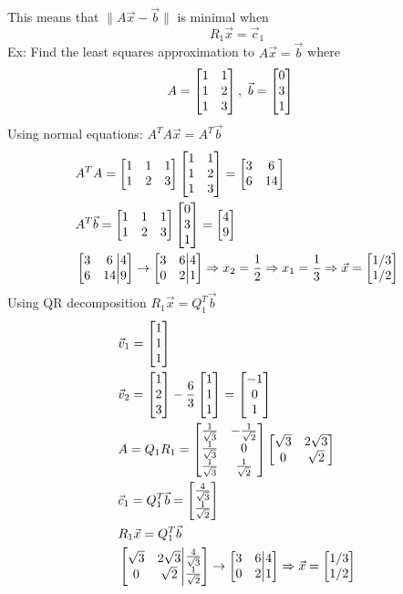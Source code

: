 \documentclass[11pt, fleqn]{article}
\begin{document}
This means that $\|A\vec{x}-\vec{b}\|$ is minimal when
$$R_1\vec{x}=\vec{c}_1$$
Ex: Find the least squares approximation to $A\vec{x}=\vec{b}$ where
\begin{align*}
    &A=\matrixx{1 & 1\\ 1 & 2\\ 1 & 3},\ \vec{b}=\matrixx{0\\3\\1}
\end{align*}
Using normal equations: $A^TA\vec{x}=A^T\vec{b}$
\begin{align*}
    &A^TA=\matrixx{1 & 1 & 1\\ 1 & 2 & 3}\matrixx{1 & 1\\ 1 & 2 \\ 1 & 3}=\matrixx{3 & 6\\ 6 & 14}\\
    &A^T\vec{b}=\matrixx{1 & 1 & 1\\ 1 & 2 & 3}\matrixx{0\\3\\1}=\matrixx{4\\9}\\
    &\augmatrix{3 & 6\\ 6 & 14}{4\\9}\to\augmatrix{3 & 6\\ 0 & 2}{4\\1}\Ra x_2=\frac{1}{2}\Ra x_1=\frac{1}{3}\Ra \vec{x}=\matrixx{1/3\\1/2}
\end{align*}
Using QR decomposition $R_1\vec{x}=Q_1^T\vec{b}$
\begin{align*}
    &\vec{v}_1=\matrixx{1\\1\\1}\\
    &\vec{v}_2=\matrixx{1\\2\\3}-\frac{6}{3}\matrixx{1\\1\\1}=\matrixx{-1\\0\\1}\\
    &A=Q_1R_1=\matrixx{\frac{1}{\sqrt{3}} & -\frac{1}{\sqrt{2}}\\ \frac{1}{\sqrt{3}} & 0\\ \frac{1}{\sqrt{3}} & \frac{1}{\sqrt{2}}}\matrixx{\sqrt{3} & 2\sqrt{3}\\ 0 & \sqrt{2}}\\
    &\vec{c}_1=Q_1^T\vec{b}=\matrixx{\frac{4}{\sqrt{3}}\\\frac{1}{\sqrt{2}}}\\
    &R_1\vec{x}=Q_1^T\vec{b}\\
    &\augmatrix{\sqrt{3} & 2\sqrt{3}\\ 0 & \sqrt{2}}{\frac{4}{\sqrt{3}}\\ \frac{1}{\sqrt{2}}}\to\augmatrix{3 & 6\\ 0 & 2}{4\\1}\Ra \vec{x}=\matrixx{1/3\\1/2}
\end{align*}
\end{document}
